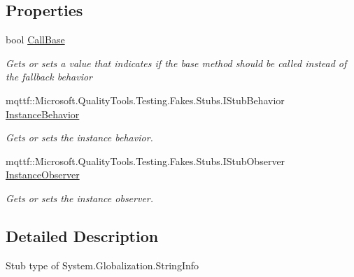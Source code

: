 \subsection*{Properties}
\begin{DoxyCompactItemize}
\item 
bool \hyperlink{class_system_1_1_globalization_1_1_fakes_1_1_stub_string_info_a25dcc073728b5c86c62989203bf4335a}{Call\-Base}
\begin{DoxyCompactList}\small\item\em Gets or sets a value that indicates if the base method should be called instead of the fallback behavior\end{DoxyCompactList}\item 
mqttf\-::\-Microsoft.\-Quality\-Tools.\-Testing.\-Fakes.\-Stubs.\-I\-Stub\-Behavior \hyperlink{class_system_1_1_globalization_1_1_fakes_1_1_stub_string_info_ac1c0666a9f16a542fcf6e8ad1ffc7bae}{Instance\-Behavior}
\begin{DoxyCompactList}\small\item\em Gets or sets the instance behavior.\end{DoxyCompactList}\item 
mqttf\-::\-Microsoft.\-Quality\-Tools.\-Testing.\-Fakes.\-Stubs.\-I\-Stub\-Observer \hyperlink{class_system_1_1_globalization_1_1_fakes_1_1_stub_string_info_a3eb9aa416ee901e22aaba301b5e06c1b}{Instance\-Observer}
\begin{DoxyCompactList}\small\item\em Gets or sets the instance observer.\end{DoxyCompactList}\end{DoxyCompactItemize}


\subsection{Detailed Description}
Stub type of System.\-Globalization.\-String\-Info



